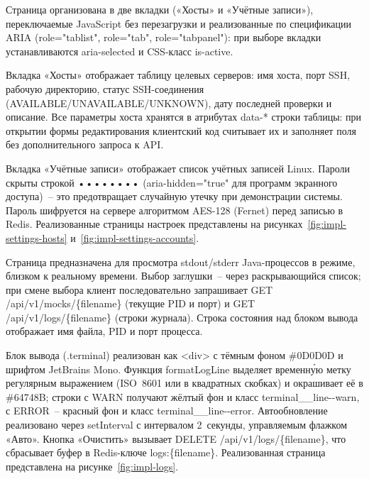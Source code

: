 Страница организована в две вкладки («Хосты» и «Учётные записи»), переключаемые JavaScript без перезагрузки и реализованные по спецификации ARIA (role="tablist"{}, role="tab"{}, role="tabpanel"{}): при выборе вкладки устанавливаются aria-selected и CSS-класс is-active.

Вкладка «Хосты» отображает таблицу целевых серверов: имя хоста, порт SSH, рабочую директорию, статус SSH-соединения (AVAILABLE/UNAVAILABLE/UNKNOWN), дату последней проверки и описание. Все параметры хоста хранятся в атрибутах data-* строки таблицы: при открытии формы редактирования клиентский код считывает их и заполняет поля без дополнительного запроса к API.

Вкладка «Учётные записи» отображает список учётных записей Linux. Пароли скрыты строкой •••••••• (aria-hidden="true" для программ экранного доступа)~-- это предотвращает случайную утечку при демонстрации системы. Пароль шифруется на сервере алгоритмом AES-128 (Fernet) перед записью в Redis. Реализованные страницы настроек представлены на рисунках~\ref{fig:impl-settings-hosts} и~\ref{fig:impl-settings-accounts}.



Страница предназначена для просмотра stdout/stderr Java-процессов в режиме, близком к реальному времени. Выбор заглушки~-- через раскрывающийся список; при смене выбора клиент последовательно запрашивает GET /api/v1/mocks/\{filename\} (текущие PID и порт) и GET /api/v1/logs/\{filename\} (строки журнала). Строка состояния над блоком вывода отображает имя файла, PID и порт процесса.

Блок вывода (.terminal) реализован как <div> с тёмным фоном \#0D0D0D и шрифтом JetBrains Mono. Функция formatLogLine выделяет временну́ю метку регулярным выражением (ISO~8601 или в квадратных скобках) и окрашивает её в \#64748B; строки с WARN получают жёлтый фон и класс terminal\_\_line{-}{-}warn, с ERROR~-- красный фон и класс terminal\_\_line{-}{-}error. Автообновление реализовано через setInterval с интервалом 2~секунды, управляемым флажком «Авто». Кнопка «Очистить» вызывает DELETE /api/v1/logs/\{filename\}, что сбрасывает буфер в Redis-ключе logs:\{filename\}. Реализованная страница представлена на рисунке~\ref{fig:impl-logs}.




